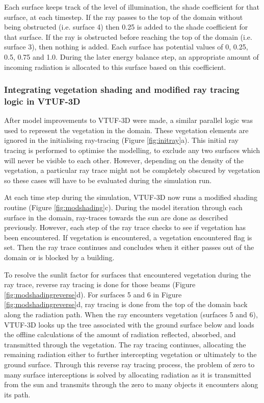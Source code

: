 \documentclass[final,3p,times,authoryear]{elsarticle}
\begin{document}
Each surface keeps track of the level of illumination, the shade coefficient for that surface, at each timestep. If the ray passes to the top of the domain without being obstructed (i.e. surface 4) then 0.25 is added to the shade coefficient for that surface. If the ray is obstructed before reaching the top of the domain (i.e. surface 3), then nothing is added. Each surface has potential values of 0, 0.25, 0.5, 0.75 and 1.0. During the later energy balance step, an appropriate amount of incoming radiation is allocated to this surface based on this coefficient.

\subsubsection{Integrating vegetation shading and modified ray tracing logic in VTUF-3D}\label{sec:Representationofvegetation}

After model improvements to VTUF-3D were made, a similar parallel logic was used to represent the vegetation in the domain. These vegetation elements are ignored in the initialising ray-tracing (Figure \ref{fig:initray}a). This initial ray tracing is performed to optimise the modelling, to exclude any two surfaces which will never be visible to each other. However, depending on the density of the vegetation, a particular ray trace might not be completely obscured by vegetation so these cases will have to be evaluated during the simulation run.

At each time step during the simulation, VTUF-3D now runs a modified shading routine (Figure \ref{fig:modshading}c). During the model iteration through each surface in the domain, ray-traces towards the sun are done as described previously. However, each step of the ray trace checks to see if vegetation has been encountered. If vegetation is encountered, a vegetation encountered flag is set. Then the ray trace continues and concludes when it either passes out of the domain or is blocked by a building. 

To resolve the sunlit factor for surfaces that encountered vegetation during the ray trace, reverse ray tracing is done for those beams (Figure \ref{fig:modshadingreverse}d). For surfaces 5 and 6 in Figure \ref{fig:modshadingreverse}d, ray tracing is done from the top of the domain back along the radiation path. When the ray encounters vegetation (surfaces 5 and 6), VTUF-3D looks up the tree associated with the ground surface below and loads the offline calculations of the amount of radiation reflected, absorbed, and transmitted through the vegetation. The ray tracing continues, allocating the remaining radiation either to further intercepting vegetation or ultimately to the ground surface. Through this reverse ray tracing process, the problem of zero to many surface interceptions is solved by allocating radiation as it is transmitted from the sun and transmits through the zero to many objects it encounters along its path. 
\end{document}
